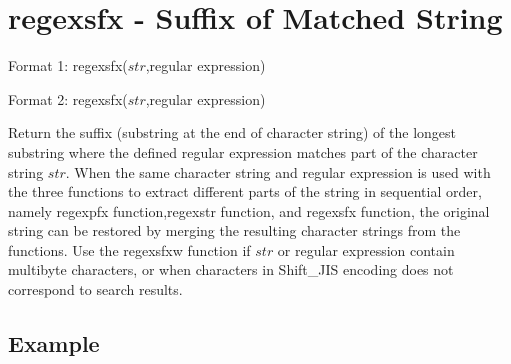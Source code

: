 
%

\section{regexsfx - Suffix of Matched String\label{sect:regexsfx}}

Format 1: regexsfx($str$,regular expression)

Format 2: regexsfx($str$,regular expression)

Return the suffix (substring at the end of character string) of the longest substring where the defined regular expression matches part of the character string $str$. When the same character string and regular expression is used with the three functions to extract different parts of the string in sequential order, namely regexpfx function,regexstr function, and regexsfx function, the original string can be restored by merging the resulting character strings from the functions.  Use the regexsfxw function if  $str$ or regular expression contain multibyte characters, or when characters in Shift\_JIS encoding does not correspond to search results. 


\subsection*{Example}


%

